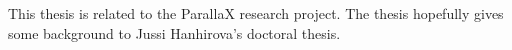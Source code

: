 This thesis is related to the ParallaX research project. The thesis hopefully gives some background to Jussi Hanhirova's doctoral thesis.

